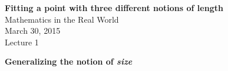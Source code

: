 \documentclass[11pt]{article}
\begin{document}
\noindent
\begin{center}
{\bf Fitting a point with three different notions of length}\\
Mathematics in the Real World\\ 
March 30, 2015\\
Lecture 1
\end{center}

\vspace{0.2in}
\noindent
{\bf Generalizing the notion of {\em size}}\\
\end{document}
